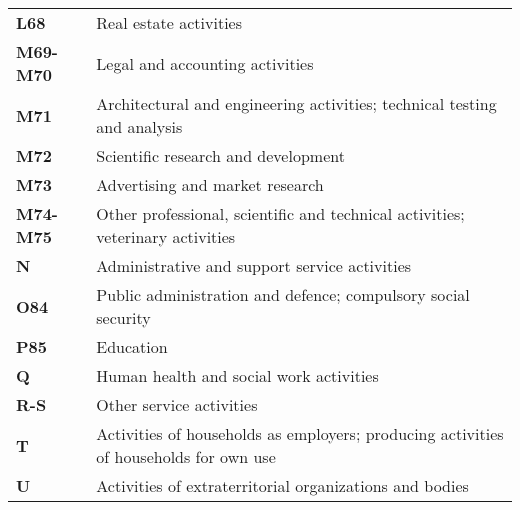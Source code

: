 \documentclass[11pt,a4paper]{article}
\begin{document}
\begin{table}[!h]
\begin{tabular}{ll}
\textbf{L68} &{Real estate activities}\\
\textbf{M69-M70} &{Legal and accounting activities}\\
\textbf{M71} &{Architectural and engineering activities; technical testing and analysis}\\
\textbf{M72} &{Scientific research and development}\\
\textbf{M73} &{Advertising and market research}\\
\textbf{M74-M75} &{Other professional, scientific and technical activities; veterinary activities}\\
\textbf{N} &{Administrative and support service activities}\\
\textbf{O84} &{Public administration and defence; compulsory social security}\\
\textbf{P85} &{Education}\\
\textbf{Q} &{Human health and social work activities}\\
\textbf{R-S} &{Other service activities}\\
\textbf{T} &{Activities of households as employers; producing activities of households for own use}\\
\textbf{U} &{Activities of extraterritorial organizations and bodies}\\
  	\end{tabular}
\label{tab:wiodindustries}
\end{table}
\end{document}
